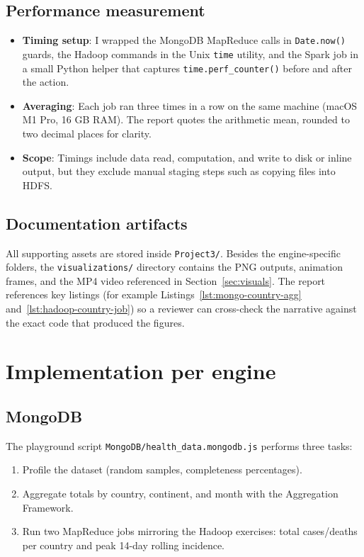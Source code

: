 \documentclass[12pt,a4paper]{article}
\begin{document}
\subsection{Performance measurement}
\begin{itemize}[leftmargin=1.2cm]
    \item \textbf{Timing setup}: I wrapped the MongoDB MapReduce calls in \texttt{Date.now()} guards, the Hadoop commands in the Unix \texttt{time} utility, and the Spark job in a small Python helper that captures \texttt{time.perf\_counter()} before and after the action.
    \item \textbf{Averaging}: Each job ran three times in a row on the same machine (macOS M1 Pro, 16 GB RAM). The report quotes the arithmetic mean, rounded to two decimal places for clarity.
    \item \textbf{Scope}: Timings include data read, computation, and write to disk or inline output, but they exclude manual staging steps such as copying files into HDFS.
\end{itemize}

\subsection{Documentation artifacts}
All supporting assets are stored inside \texttt{Project3/}. Besides the engine-specific folders, the \texttt{visualizations/} directory contains the PNG outputs, animation frames, and the MP4 video referenced in Section~\ref{sec:visuals}. The report references key listings (for example Listings~\ref{lst:mongo-country-agg} and~\ref{lst:hadoop-country-job}) so a reviewer can cross-check the narrative against the exact code that produced the figures.

\section{Implementation per engine}
\subsection{MongoDB}\label{sec:mongo}
The playground script \texttt{MongoDB/health\_data.mongodb.js} performs three tasks:
\begin{enumerate}[leftmargin=1.2cm]
    \item Profile the dataset (random samples, completeness percentages).
    \item Aggregate totals by country, continent, and month with the Aggregation Framework.
    \item Run two MapReduce jobs mirroring the Hadoop exercises: total cases/deaths per country and peak 14-day rolling incidence.
\end{enumerate}
\end{document}

